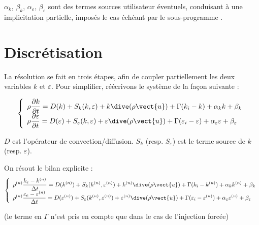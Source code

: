 $\alpha_k$, $\beta_k$, $\alpha_\varepsilon$, $\beta_\varepsilon$ sont des termes
sources utilisateur \'eventuels, conduisant \`a une implicitation partielle, impos\'es le cas
\'ech\'eant par le sous-programme .

\section*{Discr\'etisation}
La r\'esolution se fait en trois \'etapes, afin de coupler partiellement les
deux variables $k$ et $\varepsilon$. Pour simplifier, r\'e\'ecrivons le
syst\`eme de la fa\c con suivante :

\begin{equation}
\left\{\begin{array}{l}
\displaystyle
\rho\frac{\partial k}{\partial t} =
D(k) + S_k(k,\varepsilon)+k\dive(\rho\vect{u})+\Gamma(k_i-k)+\alpha_k k +\beta_k\\
\displaystyle
\rho\frac{\partial \varepsilon}{\partial t}  =
D(\varepsilon) + S_\varepsilon(k,\varepsilon)
+\varepsilon\dive(\rho\vect{u})
+\Gamma(\varepsilon_i-\varepsilon)+\alpha_\varepsilon \varepsilon +\beta_\varepsilon
\end{array}\right.
\end{equation}

$D$ est l'op\'erateur de convection/diffusion.
$S_k$ (resp. $S_\varepsilon$) est le terme source de $k$ (resp. $\varepsilon$).


On r\'esout le bilan explicite :
\begin{equation}
\left\{\begin{array}{l}
\displaystyle
\rho^{(n)}\frac{k_e-k^{(n)}}{\Delta t} =
D(k^{(n)}) + S_k(k^{(n)},\varepsilon^{(n)})
+k^{(n)}\dive(\rho\vect{u})+\Gamma(k_i-k^{(n)})+\alpha_k k^{(n)} +\beta_k\\
\displaystyle
\rho^{(n)}\frac{\varepsilon_e-\varepsilon^{(n)}}{\Delta t}  =
D(\varepsilon^{(n)}) + S_\varepsilon(k^{(n)},\varepsilon^{(n)})
+\varepsilon^{(n)}\dive(\rho\vect{u})
+\Gamma(\varepsilon_i-\varepsilon^{(n)})
+\alpha_\varepsilon \varepsilon^{(n)} +\beta_\varepsilon
\end{array}\right.
\end{equation}

(le terme en $\Gamma$ n'est pris en compte que dans le cas de l'injection forc\'ee)

